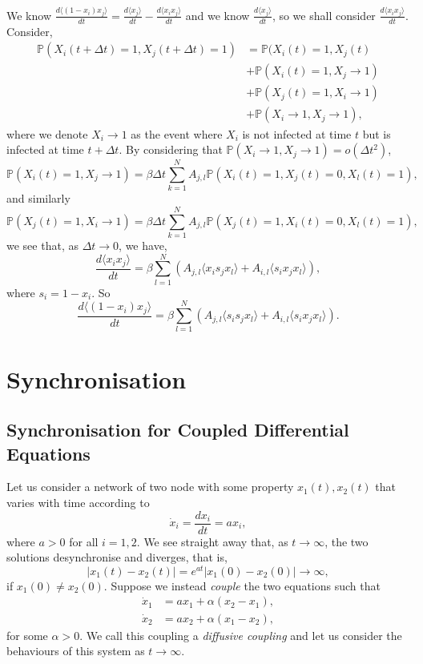 \documentclass[
]{article}
\theoremstyle{definition}
\theoremstyle{definition}
\begin{document}
We know
\(\frac{d\langle (1 - x_i) x_j \rangle}{dt} = \frac{d\langle x_j \rangle}{dt} - \frac{d\langle x_i x_j \rangle}{dt}\)
and we know \(\frac{d\langle x_j \rangle}{dt}\), so we shall consider
\(\frac{d\langle x_i x_j \rangle}{dt}\). Consider, \begin{align*}
  \mathbb{P}(X_i (t + \Delta t) = 1, X_j (t + \Delta t) = 1) & = 
    \mathbb{P}(X_i (t) = 1, X_j (t) \\
  & + \mathbb{P}(X_i (t) = 1, X_j \to 1) \\
  & + \mathbb{P}(X_j (t) = 1, X_i \to 1) \\
  & + \mathbb{P}(X_i \to 1, X_j \to 1),
\end{align*} where we denote \(X_i \to 1\) as the event where \(X_i\) is
not infected at time \(t\) but is infected at time \(t + \Delta t\). By
considering that \(\mathbb{P}(X_i \to 1, X_j \to 1) = o(\Delta t^2)\),\\
\[\mathbb{P}(X_i (t) = 1, X_j \to 1) = \beta \Delta t 
  \sum_{k = 1}^N A_{j, l} \mathbb{P}(X_i(t) = 1, X_j(t) = 0, X_l(t) = 1),\]
and similarly \[\mathbb{P}(X_j (t) = 1, X_i \to 1) = \beta \Delta t 
  \sum_{k = 1}^N A_{j, l} \mathbb{P}(X_j(t) = 1, X_i(t) = 0, X_l(t) = 1),\]
we see that, as \(\Delta t \to 0\), we have,
\[\frac{d\langle x_i x_j \rangle}{dt} = \beta \sum_{l = 1}^N 
  \left(A_{j, l} \langle x_i s_j x_l \rangle + A_{i, l} \langle s_i x_j x_l \rangle \right),\]
where \(s_i = 1 - x_i\). So
\[\frac{d\langle (1 - x_i) x_j \rangle}{dt} = \beta \sum_{l = 1}^N 
  \left(A_{j, l} \langle s_i s_j x_l \rangle + A_{i, l} \langle s_i x_j x_l \rangle \right).\]

\newpage

\hypertarget{synchronisation}{%
\section{Synchronisation}\label{synchronisation}}

\hypertarget{synchronisation-for-coupled-differential-equations}{%
\subsection{Synchronisation for Coupled Differential
Equations}\label{synchronisation-for-coupled-differential-equations}}

Let us consider a network of two node with some property
\(x_1(t), x_2(t)\) that varies with time according to
\[\dot x_i = \frac{dx_i}{dt} = ax_i,\] where \(a > 0\) for all
\(i = 1, 2\). We see straight away that, as \(t \to \infty\), the two
solutions desynchronise and diverges, that is,
\[\left| x_1(t) - x_2(t) \right| = e^{at} \left| x_1(0) - x_2(0) \right| \to \infty,\]
if \(x_1(0) \neq x_2(0)\). Suppose we instead \emph{couple} the two
equations such that \begin{align*}
  \dot x_1 & = ax_1 + \alpha(x_2 - x_1),\\
  \dot x_2 & = ax_2 + \alpha(x_1 - x_2),
\end{align*} for some \(\alpha > 0\). We call this coupling a
\emph{diffusive coupling} and let us consider the behaviours of this
system as \(t \to \infty\).
\end{document}
